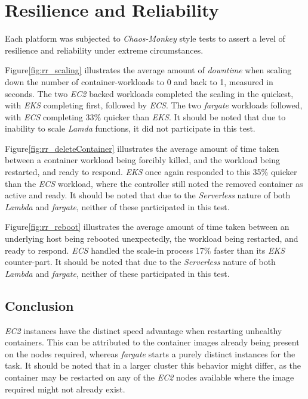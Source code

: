 \section{Resilience and Reliability}
Each platform was subjected to \textit{Chaos-Monkey} style tests to assert a level of resilience and reliability under extreme circumstances.

Figure\ref{fig:rr_scaling} illustrates the average amount of \textit{downtime} when scaling down the number of container-workloads to 0 and back to 1, measured in seconds.
The two \textit{EC2} backed workloads completed the scaling in the quickest, with \textit{EKS} completing first, followed by \textit{ECS}.
The two \textit{fargate} workloads followed, with \textit{ECS} completing 33\% quicker than \textit{EKS}.
It should be noted that due to inability to scale \textit{Lamda} functions, it did not participate in this test.

Figure\ref{fig:rr_deleteContainer} illustrates the average amount of time taken between a container workload being forcibly killed, and the workload being restarted, and ready to respond.
\textit{EKS} once again responded to this 35\% quicker than the \textit{ECS} workload, where the controller still noted the removed container as active and ready.
It should be noted that due to the \textit{Serverless} nature of both \textit{Lambda} and \textit{fargate}, neither of these participated in this test.

Figure\ref{fig:rr_reboot} illustrates the average amount of time taken between an underlying host being rebooted unexpectedly, the workload being restarted, and ready to respond.
\textit{ECS} handled the scale-in process 17\% faster than its \textit{EKS} counter-part.
It should be noted that due to the \textit{Serverless} nature of both \textit{Lambda} and \textit{fargate}, neither of these participated in this test.

\subsection*{Conclusion}
\textit{EC2} instances have the distinct speed advantage when restarting unhealthy containers.
This can be attributed to the container images already being present on the nodes required, whereas \textit{fargate} starts a purely distinct instances for the task.
It should be noted that in a larger cluster this behavior might differ, as the container may be restarted on any of the \textit{EC2} nodes available where the image required might not already exist.


